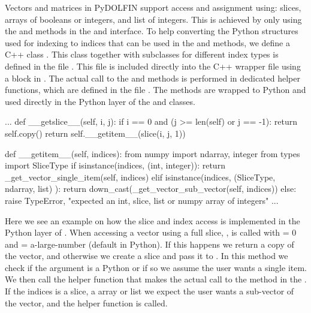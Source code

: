 Vectors and matrices in PyDOLFIN support access and assignment using: slices, \numpy arrays of booleans or integers, and list of integers. This is achieved by only using the  and  methods in the  and  interface. To help converting the Python structures used for indexing to indices that can be used in the  and  methods, we define a C++ class . This class together with subclasses for different index types is defined in the file . This file is included directly into the C++ wrapper file using a \emp{\%\{$\ldots$\}\%} block in . The actual call to the  and  methods is performed in dedicated helper functions, which are defined in the file . The methods are wrapped to Python and used directly in the Python layer of the  and  classes.
\begin{c++}
   ...
    def __getslice__(self, i, j):
        if i == 0 and (j >= len(self) or j == -1):
            return self.copy()
        return self.__getitem__(slice(i, j, 1))

    def __getitem__(self, indices):
        from numpy import ndarray, integer
        from types import SliceType
        if isinstance(indices, (int, integer)):
            return _get_vector_single_item(self, indices)
        elif isinstance(indices, (SliceType, ndarray, list) ):
            return down_cast(_get_vector_sub_vector(self, indices))
        else:
            raise TypeError, "expected an int, slice, list or numpy array of integers"
  ...
\end{c++}
Here we see an example on how the slice and index access is implemented in the Python layer of . When accessing a vector using a full slice, ,  is called with  = 0 and  = a-large-number (default in Python).  If this happens we return a copy of the vector, and otherwise we create a slice and pass it to . In this method we check if the  argument is a Python  or \numpy {} if so we assume the user wants a single item. We then call the helper function  that makes the actual call to the  method in the . If the indices is a slice, a \numpy array or list we expect the user wants a sub-vector of the vector, and the helper function  is called.


